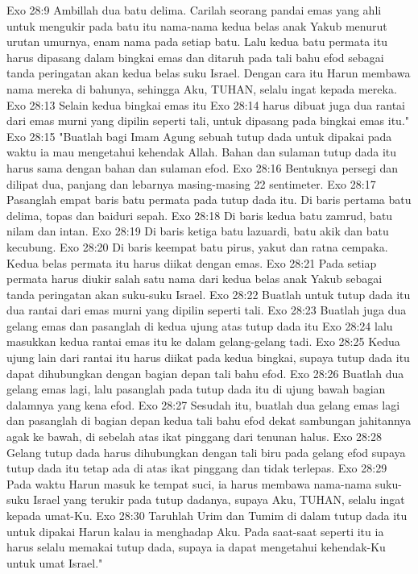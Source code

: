 Exo 28:9  Ambillah dua batu delima. Carilah seorang pandai emas yang ahli untuk mengukir pada batu itu nama-nama kedua belas anak Yakub menurut urutan umurnya, enam nama pada setiap batu. Lalu kedua batu permata itu harus dipasang dalam bingkai emas dan ditaruh pada tali bahu efod sebagai tanda peringatan akan kedua belas suku Israel. Dengan cara itu Harun membawa nama mereka di bahunya, sehingga Aku, TUHAN, selalu ingat kepada mereka.
Exo 28:13  Selain kedua bingkai emas itu
Exo 28:14  harus dibuat juga dua rantai dari emas murni yang dipilin seperti tali, untuk dipasang pada bingkai emas itu."
Exo 28:15  "Buatlah bagi Imam Agung sebuah tutup dada untuk dipakai pada waktu ia mau mengetahui kehendak Allah. Bahan dan sulaman tutup dada itu harus sama dengan bahan dan sulaman efod.
Exo 28:16  Bentuknya persegi dan dilipat dua, panjang dan lebarnya masing-masing 22 sentimeter.
Exo 28:17  Pasanglah empat baris batu permata pada tutup dada itu. Di baris pertama batu delima, topas dan baiduri sepah.
Exo 28:18  Di baris kedua batu zamrud, batu nilam dan intan.
Exo 28:19  Di baris ketiga batu lazuardi, batu akik dan batu kecubung.
Exo 28:20  Di baris keempat batu pirus, yakut dan ratna cempaka. Kedua belas permata itu harus diikat dengan emas.
Exo 28:21  Pada setiap permata harus diukir salah satu nama dari kedua belas anak Yakub sebagai tanda peringatan akan suku-suku Israel.
Exo 28:22  Buatlah untuk tutup dada itu dua rantai dari emas murni yang dipilin seperti tali.
Exo 28:23  Buatlah juga dua gelang emas dan pasanglah di kedua ujung atas tutup dada itu
Exo 28:24  lalu masukkan kedua rantai emas itu ke dalam gelang-gelang tadi.
Exo 28:25  Kedua ujung lain dari rantai itu harus diikat pada kedua bingkai, supaya tutup dada itu dapat dihubungkan dengan bagian depan tali bahu efod.
Exo 28:26  Buatlah dua gelang emas lagi, lalu pasanglah pada tutup dada itu di ujung bawah bagian dalamnya yang kena efod.
Exo 28:27  Sesudah itu, buatlah dua gelang emas lagi dan pasanglah di bagian depan kedua tali bahu efod dekat sambungan jahitannya agak ke bawah, di sebelah atas ikat pinggang dari tenunan halus.
Exo 28:28  Gelang tutup dada harus dihubungkan dengan tali biru pada gelang efod supaya tutup dada itu tetap ada di atas ikat pinggang dan tidak terlepas.
Exo 28:29  Pada waktu Harun masuk ke tempat suci, ia harus membawa nama-nama suku-suku Israel yang terukir pada tutup dadanya, supaya Aku, TUHAN, selalu ingat kepada umat-Ku.
Exo 28:30  Taruhlah Urim dan Tumim di dalam tutup dada itu untuk dipakai Harun kalau ia menghadap Aku. Pada saat-saat seperti itu ia harus selalu memakai tutup dada, supaya ia dapat mengetahui kehendak-Ku untuk umat Israel."
